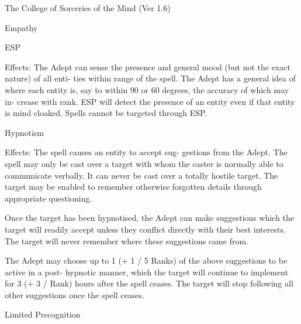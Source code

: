 \begin{Chapter}{The College of Sorceries of the Mind (Ver 1.6)}
\begin{spell}[G-3]{Empathy }
\end{spell}

\begin{spell}[G-4]{ESP }

Effects:  The  Adept  can  sense  the  presence  and 
general mood (but not the exact nature) of all enti-
ties  within  range  of  the  spell.  The  Adept  has  a 
general  idea  of  where  each  entity  is, say  to  within 
90  or  60  degrees,  the  accuracy  of  which  may  in-
crease  with  rank.  ESP  will  detect  the  presence  of 
an entity even if that entity is mind cloaked. Spells 
cannot be targeted through ESP. 

\end{spell}

\begin{spell}[G-5]{Hypnotism }

Effects:  The  spell  causes  an  entity  to  accept  sug-
gestions  from  the  Adept.  The  spell  may  only  be 
cast over a target with whom the caster is normally 
able to communicate verbally.  It can never be cast 
over  a  totally  hostile  target.  The  target  may  be 
enabled  to  remember  otherwise  forgotten  details 
through appropriate questioning. 

Once the target has been hypnotised, the Adept can 
make  suggestions  which  the  target  will  readily 
accept  unless  they  conflict  directly  with  their  best 
interests.  The  target  will  never  remember  where 
these suggestions came from. 

The  Adept  may  choose  up to  1  (+  1 / 5 Ranks)  of 
the  above  suggestions  to  be  active  in  a  post-
hypnotic manner, which the target will continue to 
implement  for  3  (+ 3  / Rank)  hours after  the  spell 
ceases.  The  target  will  stop  following  all  other 
suggestions once the spell ceases. 

\end{spell}

\begin{spell}[G-6]{Limited Precognition }


\end{spell}
\end{Chapter}
